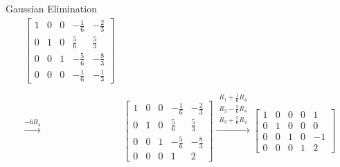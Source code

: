 \documentclass{beamer}
\begin{document}
\begin{frame}{Gaussian Elimination}
{\begin{align*}
\left[ 
    \begin{array}{cccc|c}
    1 & 0 & 0 & -\frac{1}{6} & -\frac{2}{3} \\
    0 & 1 & 0 & \frac{5}{6} & \frac{5}{3} \\
    0 & 0 & 1 & -\frac{5}{6} & -\frac{8}{3} \\
    0 & 0 & 0 & -\frac{1}{6} & -\frac{1}{3}
    \end{array}
\right] \\ \\ 
\xrightarrow{-6R_4}
&\left[ 
    \begin{array}{cccc|c}
    1 & 0 & 0 & -\frac{1}{6} & -\frac{2}{3} \\
    0 & 1 & 0 & \frac{5}{6} & \frac{5}{3} \\
    0 & 0 & 1 & -\frac{5}{6} & -\frac{8}{3} \\
    0 & 0 & 0 & 1 & 2
    \end{array}
\right]
\xrightarrow{\substack{R_1 + \frac{1}{6}R_4 \\ R_2 - \frac{5}{6}R_4 \\ R_3 + \frac{5}{6}R_4}}
\left[ 
    \begin{array}{cccc|c}
    1 & 0 & 0 & 0 & 1 \\
    0 & 1 & 0 & 0 & 0 \\
    0 & 0 & 1 & 0 & -1 \\
    0 & 0 & 0 & 1 & 2
    \end{array}
\right]
\end{align*}
}
\end{frame}
\end{document}
